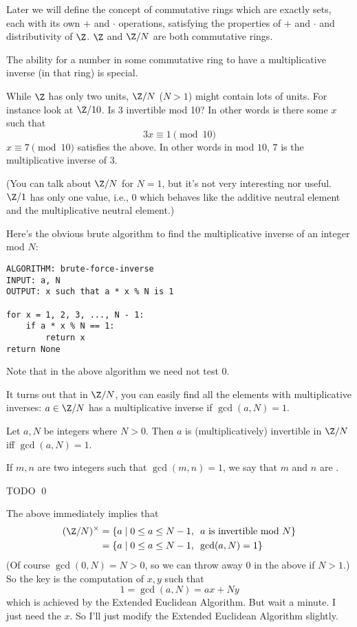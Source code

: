 Later we will define the concept of commutative rings
which are exactly sets, each with its own $+$ and $\cdot$ operations,
satisfying the properties of $+$ and $\cdot$ and distributivity of $\Z$.
$\Z$ and $\Z/N$ are both commutative rings.

The ability for a number in some commutative ring
to have a multiplicative inverse (in that ring) is special.

While $\Z$ has only two units, $\Z/N$ ($N > 1$) might contain lots of units.
For instance look at $\Z/10$.
Is $3$ invertible mod 10?
In other words is there some $x$ such that
\[
3x \equiv 1 \pmod{10}
\]
$x \equiv 7 \pmod{10}$ satisfies the above.
In other words in mod $10$, $7$ is the multiplicative inverse of $3$.

(You can talk about $\Z/N$ for $N = 1$, but it's not very interesting
nor useful. $\Z/1$ has only one value, i.e., $0$ which behaves like the
additive neutral element and the multiplicative neutral element.)

Here's the obvious brute algorithm to find the multiplicative inverse of
an integer mod $N$:

\begin{Verbatim}[frame=single,fontsize=\footnotesize]
ALGORITHM: brute-force-inverse
INPUT: a, N
OUTPUT: x such that a * x % N is 1

for x = 1, 2, 3, ..., N - 1:
    if a * x % N == 1:
        return x
return None
\end{Verbatim}

Note that in the above algorithm we need not test $0$.



It turns out that in $\Z/N$, you can easily find all the elements
with multiplicative inverses: $a \in \Z/N$ has a multiplicative
inverse if $\gcd(a, N) = 1$.

\begin{prop}
  Let $a, N$ be integers where $N > 0$. Then
  $a$ is (multiplicatively) invertible in $\Z/N$ iff $\gcd(a, N) = 1$.
\end{prop}

If $m,n$ are two integers such that $\gcd(m,n) = 1$, we say that
$m$ and $n$ are
.

\proof
TODO
\qed

The above immediately implies that
\begin{align*}
(\Z/N)^\times
&= \{ a \mid 0 \leq a \leq N - 1, \,\,\, \text{$a$ is invertible mod $N$} \}\\
&= \{ a \mid 0 \leq a \leq N - 1, \,\,\, \gcd(a, N) = 1 \}
\end{align*}
(Of course $\gcd(0, N) = N > 0$, so we can throw away $0$ in the above
if $N > 1$.)
So the key is the computation of $x,y$ such that
\[
1 = \gcd(a, N) = ax + Ny
\]
which is achieved by the Extended Euclidean Algorithm.
But wait a minute. I just need the $x$.
So I'll just modify the Extended Euclidean Algorithm slightly.

